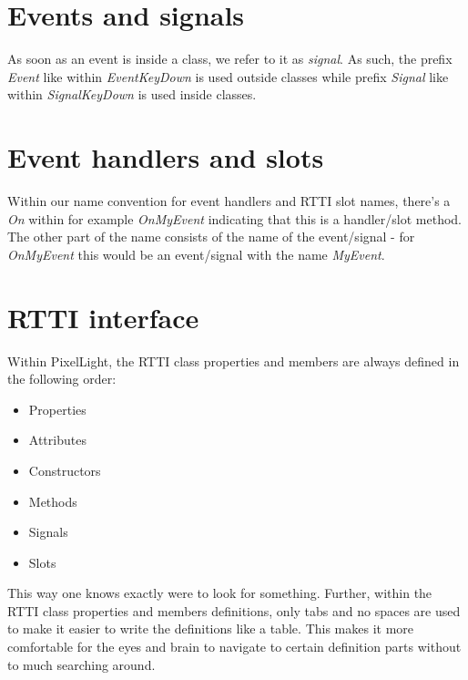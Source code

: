 \section{Events and signals}
As soon as an event is inside a class, we refer to it as \emph{signal}. As such, the prefix \emph{Event} like within \emph{EventKeyDown} is used outside classes while prefix \emph{Signal} like within \emph{SignalKeyDown} is used inside classes.




\section{Event handlers and slots}
Within our name convention for event handlers and RTTI slot names, there's a \emph{On} within for example \emph{OnMyEvent} indicating that this is a handler/slot method. The other part of the name consists of the name of the event/signal - for \emph{OnMyEvent} this would be an event/signal with the name \emph{MyEvent}.




\section{RTTI interface}
Within PixelLight, the RTTI class properties and members are always defined in the following order:
\begin{itemize}
\item Properties
\item Attributes
\item Constructors
\item Methods
\item Signals
\item Slots
\end{itemize}
This way one knows exactly were to look for something. Further, within the RTTI class properties and members definitions, only tabs and no spaces are used to make it easier to write the definitions like a table. This makes it more comfortable for the eyes and brain to navigate to certain definition parts without to much searching around.

